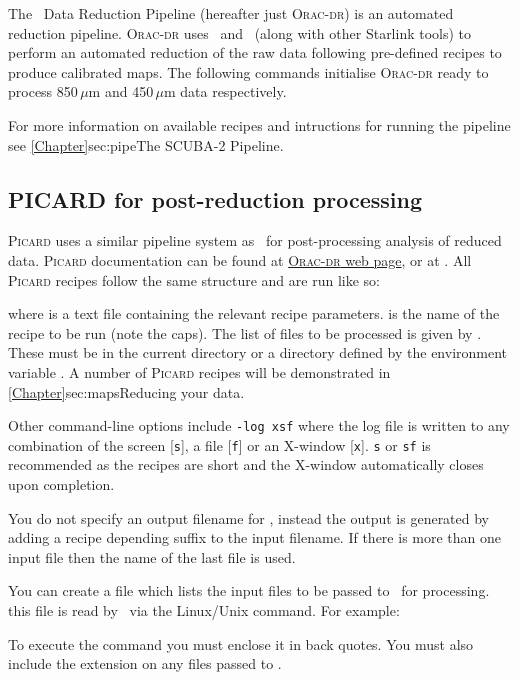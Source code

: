 \documentclass[11pt,oneside,chapters]{starlink}
\begin{document}
The \oracdr\ Data Reduction Pipeline \cite{oracdr} (hereafter just
\textsc{Orac-dr}) is an automated reduction pipeline. \textsc{Orac-dr} uses
\smurf\ and \Kappa\ (along with other Starlink tools) to perform an automated
reduction of the raw data following pre-defined recipes to produce
calibrated maps.  The following commands initialise \textsc{Orac-dr}
ready to process 850\,$\mu$m and 450\,$\mu$m data respectively.
\begin{terminalv}
\end{terminalv}
For more information on available recipes and intructions for running the pipeline
see \cref{Chapter}{sec:pipe}{The SCUBA-2 Pipeline}.

\subsection{PICARD for post-reduction processing}

\textsc{Picard} uses a similar pipeline system as \oracdr\ for
post-processing analysis of reduced data. \textsc{Picard}
documentation can be found at 
\href{http://www.oracdr.org/oracdr/PICARD}{\textsc{Orac-dr} web page}, or at
\picardsun. All \textsc{Picard} recipes follow the same structure and
are run like so:
\begin{terminalv}
\end{terminalv}
where  is a text file containing the
relevant recipe parameters.  is the name of the recipe
to be run (note the caps). The list of files to be processed is given
by  . These must be in the current directory or a
directory defined by the environment variable . A
number of \textsc{Picard} recipes will be demonstrated in
\cref{Chapter}{sec:maps}{Reducing your data}.

Other command-line options include \texttt{-log xsf} where the log
file is written to any combination of the screen [\texttt{s}], a file
[\texttt{f}] or an X-window [\texttt{x}]. \texttt{s} or \texttt{sf} is
recommended as the recipes are short and the X-window automatically
closes upon completion.

You do not specify an output filename for \picard, instead the output is
generated by adding a recipe depending suffix to the input filename. If
there is more than one input file then the name of the last file is used.

You can create a file which lists the input files to be passed to \picard\ for
processing. this file is read by \picard\ via the Linux/Unix 
command. For example:
\begin{terminalv}
\end{terminalv}
To execute the  command you must enclose it in back quotes. You must
also include the  extension on any files passed to \picard.
\end{document}
